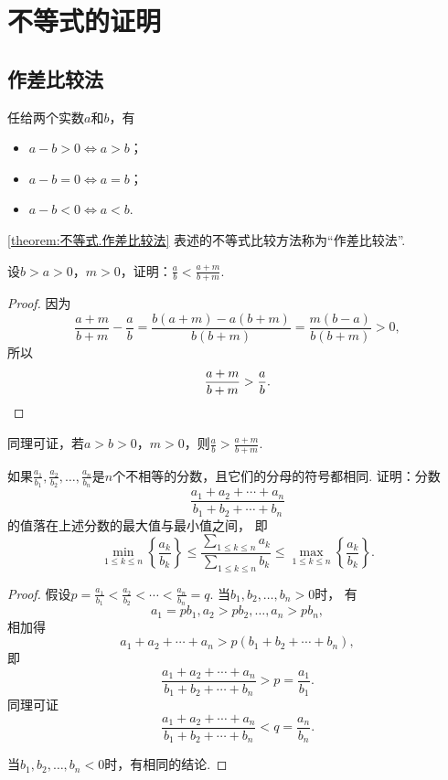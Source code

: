 \section{不等式的证明}
\subsection{作差比较法}
\begin{theorem}\label{theorem:不等式.作差比较法}
任给两个实数\(a\)和\(b\)，有\begin{itemize}
	\item \(a - b > 0 \iff a > b\)；
	\item \(a - b = 0 \iff a = b\)；
	\item \(a - b < 0 \iff a < b\).
\end{itemize}
\end{theorem}
\cref{theorem:不等式.作差比较法} 表述的不等式比较方法称为“作差比较法”.

\begin{example}\label{example:不等式.真分数的分子分母同加一个正数}
设\(b > a > 0\)，\(m > 0\)，证明：\(\frac{a}{b} < \frac{a+m}{b+m}\).
\begin{proof}
因为\[
	\frac{a+m}{b+m} - \frac{a}{b}
	= \frac{b(a+m) - a(b+m)}{b(b+m)}
	= \frac{m(b-a)}{b(b+m)} > 0,
\]
所以\[
	\frac{a+m}{b+m} > \frac{a}{b}.
	\qedhere
\]
\end{proof}
\end{example}
同理可证，若\(a > b > 0\)，\(m > 0\)，则\(\frac{a}{b} > \frac{a+m}{b+m}\).

\begin{example}\label{example:不等式.不同浓度的溶液的混合}
如果\(\frac{a_1}{b_1},\frac{a_2}{b_2},\dotsc,\frac{a_n}{b_n}\)是\(n\)个不相等的分数，且它们的分母的符号都相同.
证明：分数\[
	\frac{a_1+a_2+\dotsb+a_n}{b_1+b_2+\dotsb+b_n}
\]的值落在上述分数的最大值与最小值之间，
即\begin{equation}
	\min_{1 \leq k \leq n}\left\{ \frac{a_k}{b_k} \right\}
	\leq
	\frac{\sum_{1 \leq k \leq n} a_k}{\sum_{1 \leq k \leq n} b_k}
	\leq
	\max_{1 \leq k \leq n}\left\{ \frac{a_k}{b_k} \right\}.
\end{equation}
\begin{proof}
假设\(p=\frac{a_1}{b_1}<\frac{a_2}{b_2}<\dotsb<\frac{a_n}{b_n}=q\).
当\(b_1,b_2,\dotsc,b_n>0\)时，
有\[
	a_1 = p b_1,
	a_2 > p b_2,
	\dotsc,
	a_n > p b_n,
\]
相加得\[
	a_1 + a_2 + \dotsb + a_n > p(b_1 + b_2 + \dotsb + b_n),
\]
即\[
	\frac{a_1+a_2+\dotsb+a_n}{b_1+b_2+\dotsb+b_n} > p = \frac{a_1}{b_1}.
\]
同理可证\[
	\frac{a_1+a_2+\dotsb+a_n}{b_1+b_2+\dotsb+b_n} < q = \frac{a_n}{b_n}.
\]

当\(b_1,b_2,\dotsc,b_n<0\)时，有相同的结论.
\end{proof}
\end{example}

